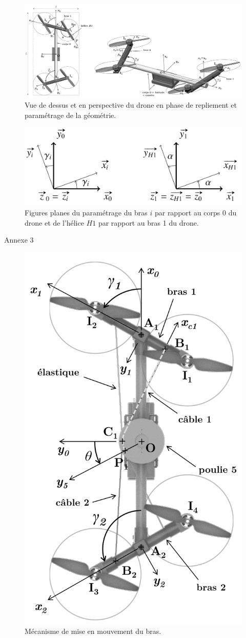 \begin{figure}[ht!]
\begin{center}
 \includegraphics[width=0.95\linewidth]{img/fig23}
\end{center}
\caption{\label{fig23} Vue de dessus et en perspective du drone en phase de repliement et paramétrage de la géométrie.}
\end{figure}

\begin{figure}[ht!]
\begin{center}
 \includegraphics[width=0.55\linewidth]{img/fig24}
\end{center}
\caption{\label{fig24} Figures planes du paramétrage du bras $i$ par rapport au corps 0 du drone et de l’hélice $H1$ par rapport au bras 1 du drone.}
\end{figure}

\newpage

\begin{center}
\Large{Annexe 3}
\end{center}

\begin{figure}[ht!]
\begin{center}
 \includegraphics[width=0.3\linewidth]{img/fig25}
\end{center}
\caption{\label{fig25} Mécanisme de mise en mouvement du bras.}
\end{figure}

